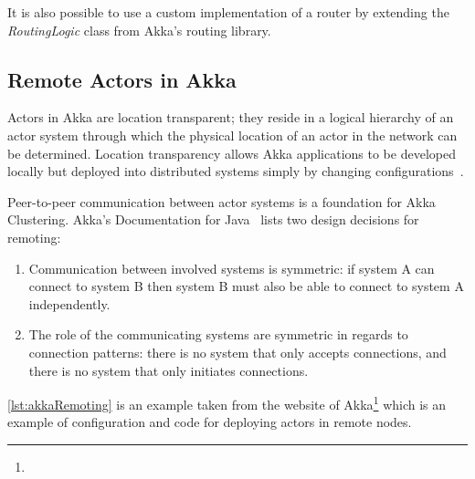 It is also possible to use a custom implementation of a router by extending the \emph{RoutingLogic} class from Akka's routing library.

  \subsection{Remote Actors in Akka}
  Actors in Akka are location transparent; they reside in a logical hierarchy of an actor system through which the physical location of an actor in the network can be determined. Location transparency allows Akka applications to be developed locally but deployed into distributed systems simply by changing configurations~\cite{akkaJavaDoc}.

  Peer-to-peer communication between actor systems is a foundation for Akka Clustering. Akka's Documentation for Java~\cite{akkaJavaDoc} lists two design decisions for remoting:
\begin{enumerate}

  \item Communication between involved systems is symmetric: if system A can connect to system B then system B must also be able to connect to system A independently.

  \item The role of the communicating systems are symmetric in regards to connection patterns: there is no system that only accepts connections, and there is no system that only initiates connections.
\end{enumerate}

\autoref{lst:akkaRemoting} is an example taken from the website of Akka\footnote{} which is an example of configuration and code for deploying actors in remote nodes.

